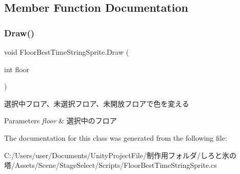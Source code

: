 \subsection{Member Function Documentation}
\mbox{\label{class_floor_best_time_string_sprite_a3b64bc5236525a2695b79a7ad95c130f}} 
\subsubsection{\texorpdfstring{Draw()}{Draw()}}
{\footnotesize\ttfamily void Floor\+Best\+Time\+String\+Sprite.\+Draw (\begin{DoxyParamCaption}\item[{int}]{floor }\end{DoxyParamCaption})\hspace{0.3cm}{\ttfamily [inline]}}



選択中フロア、未選択フロア、未開放フロアで色を変える 


\begin{DoxyParams}{Parameters}
{\em floor} & 選択中のフロア\\
\hline
\end{DoxyParams}


The documentation for this class was generated from the following file\+:\begin{DoxyCompactItemize}
\item 
C\+:/\+Users/user/\+Documents/\+Unity\+Project\+File/制作用フォルダ/しろと氷の塔/\+Assets/\+Scene/\+Stage\+Select/\+Scripts/Floor\+Best\+Time\+String\+Sprite.\+cs\end{DoxyCompactItemize}
